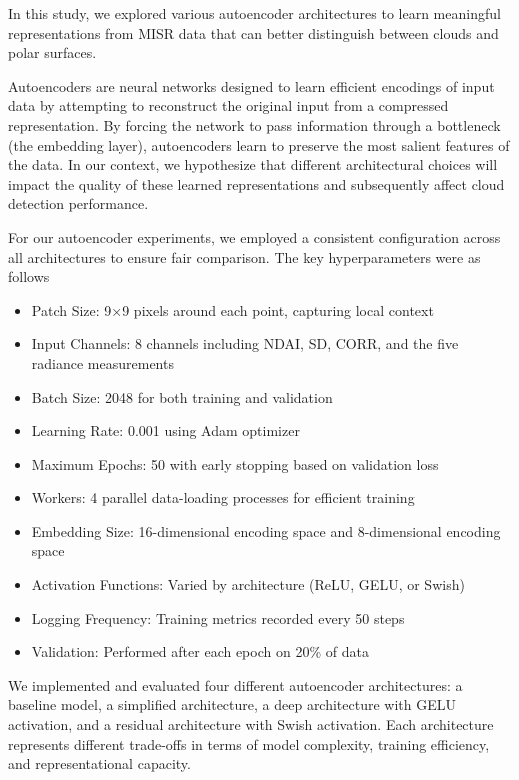 \documentclass[10pt,letterpaper]{article}
\begin{document}
In this study, we explored various autoencoder architectures to learn meaningful representations from MISR data that can better distinguish between clouds and polar surfaces.

Autoencoders are neural networks designed to learn efficient encodings of input data by attempting to reconstruct the original input from a compressed representation. By forcing the network to pass information through a bottleneck (the embedding layer), autoencoders learn to preserve the most salient features of the data. In our context, we hypothesize that different architectural choices will impact the quality of these learned representations and subsequently affect cloud detection performance.

For our autoencoder experiments, we employed a consistent configuration across all architectures to ensure
fair comparison. The key hyperparameters were as follows

\begin{itemize}
    \item Patch Size: 9×9 pixels around each point, capturing local context
    \item Input Channels: 8 channels including NDAI, SD, CORR, and the five radiance measurements
    \item Batch Size: 2048 for both training and validation
    \item  Learning Rate: 0.001 using Adam optimizer
    \item Maximum Epochs: 50 with early stopping based on validation loss
    \item Workers: 4 parallel data-loading processes for efficient training
    \item Embedding Size: 16-dimensional encoding space and 8-dimensional encoding space
    \item Activation Functions: Varied by architecture (ReLU, GELU, or Swish)
    \item Logging Frequency: Training metrics recorded every 50 steps
    \item Validation: Performed after each epoch on 20\% of data
\end{itemize}


We implemented and evaluated four different autoencoder architectures: a baseline model, a simplified architecture, a deep architecture with GELU activation, and a residual architecture with Swish activation. Each architecture represents different trade-offs in terms of model complexity, training efficiency, and representational capacity. 
\end{document}
